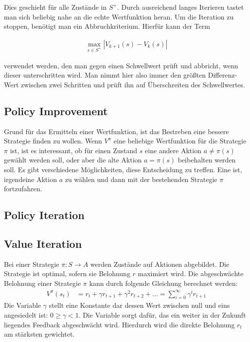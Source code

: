 \documentclass[10pt]{scrartcl}
\begin{document}
Dies geschieht für alle Zustände in $S^+$. Durch ausreichend langes Iterieren tastet man sich beliebig nahe an die echte Wertfunktion heran. Um die Iteration zu stoppen, benötigt man ein Abbruchkriterium. Hierfür kann der Term 

\begin{align*}
\max\limits_{s\in S^+} |V_{k+1}(s)-V_k(s)|
\end{align*}

verwendet werden, den man gegen einen Schwellwert prüft und abbricht, wenn dieser unterschritten wird. Man nimmt hier also immer den größten Differenz-Wert zwischen zwei Schritten und prüft ihn auf Überschreiten des Schwellwertes.


\subsection{Policy Improvement}
Grund für das Ermitteln einer Wertfunktion, ist das Bestreben eine bessere Strategie finden zu wollen. Wenn $V^\pi$ eine beliebige Wertfunktion für die  Strategie $\pi$ ist,  ist es interessant, ob für einen Zustand $s$ eine andere Aktion $a\neq\pi(s)$   gewählt werden soll, oder aber die alte Aktion $a=\pi(s)$ beibehalten werden soll.
Es gibt verschiedene Möglichkeiten, diese  Entscheidung zu treffen. Eine ist, irgendeine Aktion $a$ zu wählen und dann mit der bestehenden Strategie $\pi$ fortzufahren.

\subsection{Policy Iteration}
\subsection{Value Iteration}
Bei einer Strategie $\pi : S \rightarrow A $ werden Zustände auf Aktionen abgebildet. Die Strategie ist optimal, sofern sie Belohnung $r$ maximiert wird. Die abgeschwächte Belohnung einer Strategie $\pi$ kann durch folgende Gleichung berechnet werden:
\begin{align}\label{gleichungvp}
V^{\pi}(s_t) &= r_t + \gamma r_{t+1} + \gamma^2r_{t+2} + ... = \sum^{\infty}_{i=0} \gamma^ir_{t+1}
\end{align}
Die Variable $\gamma$ stellt eine Konstante dar dessen Wert zwischen null und eins angesiedelt ist: $0 \geq \gamma < 1$. Die Variable sorgt dafür, das ein weiter in der Zukunft liegendes Feedback abgeschwächt wird. Hierdurch wird die direkte Belohnung $r_t$ am stärksten gewichtet.
\end{document}
